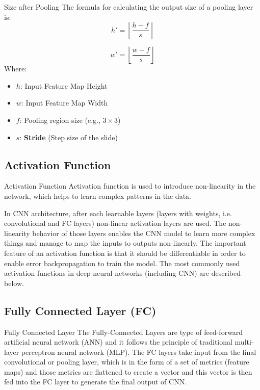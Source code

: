 \documentclass[aspectratio=169,xcolor=dvipsnames]{beamer}
\begin{document}
\begin{frame}{Size after Pooling}
    The formula for calculating the output size of a pooling layer is:
    \begin{equation}
        h' = \left\lfloor \frac{h - f}{s} \right\rfloor
    \end{equation}

    \begin{equation}
        w' = \left\lfloor \frac{w - f}{s} \right\rfloor
    \end{equation}
    Where:
    \begin{itemize}
        \item $h$: Input Feature Map Height
        \item $w$: Input Feature Map Width
        \item $f$: Pooling region size (e.g., $3 \times 3$)
        \item $s$: \textbf{Stride} (Step size of the slide)
    \end{itemize}
\end{frame}

\subsection{Activation Function}

\begin{frame}{Activation Function}
    Activation function is used to introduce non-linearity in the network, which helps to learn complex patterns in the data.
    \begin{alertblock}{}
        In CNN architecture, after each learnable layers (layers with weights, i.e. convolutional and FC layers) non-linear activation layers are used. The non-linearity behavior of those layers enables the CNN model to learn more complex things and manage to map the inputs to outputs non-linearly. The important feature of an activation function is that it should be diﬀerentiable in order to enable error backpropagation to train the model. The most commonly used activation functions in deep neural networks (including CNN) are described below.  
    \end{alertblock}
\end{frame}

\subsection{Fully Connected Layer (FC)}

\begin{frame}{Fully Connected Layer}
The Fully-Connected Layers are type of feed-forward artiﬁcial neural network (ANN) and it follows the principle of traditional multi-layer perceptron neural network (MLP). The FC layers take input from the ﬁnal convolutional or pooling layer, which is in the form of a set of metrics (feature maps) and those metrics are ﬂattened to create a vector and this vector is then fed into the FC layer to generate the ﬁnal output of CNN.
\end{frame}
\end{document}
